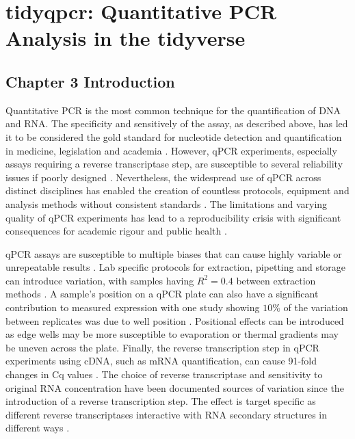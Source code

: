 \documentclass[../main.tex]{subfiles}
\begin{document}
\chapter{tidyqpcr: Quantitative PCR Analysis in the tidyverse}

\section{Chapter 3 Introduction}

Quantitative PCR is the most common technique for the quantification of DNA and RNA. 
The specificity and sensitively of the assay, as described above, has led it to be considered the gold standard for nucleotide detection and quantification in medicine, legislation and academia \parencite{Kubista2006}.
However, qPCR experiments, especially assays requiring a reverse transcriptase step, are susceptible to several reliability issues if poorly designed \parencite{Bustin2002}.
Nevertheless, the widespread use of qPCR across distinct disciplines has enabled the creation of countless protocols, equipment and analysis methods without consistent standards \parencite{Bustin2021}.
The limitations and varying quality of qPCR experiments has lead to a reproducibility crisis with significant consequences for academic rigour \parencite{Garson2009} and public health \parencite{Bustin2013}. 

qPCR assays are susceptible to multiple biases that can cause highly variable or unrepeatable results \parencite{Bustin2002}.
Lab specific protocols for extraction, pipetting and storage can introduce variation, with samples having $R^2 = 0.4$ between extraction methods \parencite{Bustin2017, Dagnall2017}.
A sample's position on a qPCR plate can also have a significant contribution to measured expression with one study showing $10\%$ of the variation between replicates was due to well position \parencite{Eisenberg2015}. 
Positional effects can be introduced as edge wells may be more susceptible to evaporation or thermal gradients may be uneven across the plate. 
Finally, the reverse transcription step in qPCR experiments using cDNA, such as mRNA quantification, can cause 91-fold changes in Cq values \parencite{Stahlberg2004}. 
The choice of reverse transcriptase and sensitivity to original RNA concentration have been documented sources of variation since the introduction of a reverse transcription step.
The effect is target specific as different reverse transcriptases interactive with RNA secondary structures in different ways \parencite{Brooks1995, Williams1992}.
\end{document}

